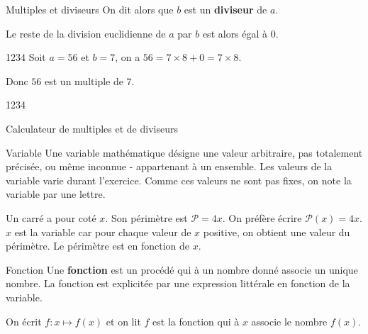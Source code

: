 \begin{pageCours}
\begin{DefT}{Multiples et diviseurs}
 On dit alors que $b$ est un \textbf{diviseur} de $a$. 
\end{DefT}

\begin{Rq}

Le reste de la division euclidienne de $a$ par $b$ est alors égal à $0$. 
\end{Rq}


\begin{minipage}{0.6\linewidth}

\begin{ExQr}{1234}
Soit $a=56$ et $b=7$, on a $56 = 7 \times 8+0 = 7 \times 8$. 

Donc $56$ est un multiple de $7$.

\end{ExQr}
\end{minipage}
\begin{minipage}{0.4\linewidth}
\begin{OuQr}{1234}

 Calculateur de multiples et de diviseurs
\end{OuQr}
\end{minipage}
 
 
 
 



 

 
\begin{DefT}{Variable}
Une variable  mathématique désigne une valeur arbitraire, pas totalement précisée, ou même inconnue - appartenant à un ensemble. Les valeurs de la variable varie durant l'exercice. Comme ces valeurs ne sont pas fixes, on note la variable par une lettre.
\end{DefT}

\begin{Ex}
Un carré a pour coté $x$. Son périmètre est $\mathscr P = 4x$. On préfère écrire $\mathscr{P}(x) = 4x$. $x$ est la variable car pour chaque valeur de $x$ positive, on obtient une valeur du périmètre. Le périmètre est en fonction de $x$.
\end{Ex}

\begin{DefT}{Fonction}
Une \textbf{fonction}  est un procédé qui à un nombre donné associe un unique nombre. La fonction est explicitée par une expression littérale en fonction de la variable.
\end{DefT}

\begin{Nt}
On écrit $f : x \longmapsto f(x)$ et on lit $f$ est la fonction qui à $x$ associe le nombre $f(x)$.
\end{Nt}


\end{pageCours}
